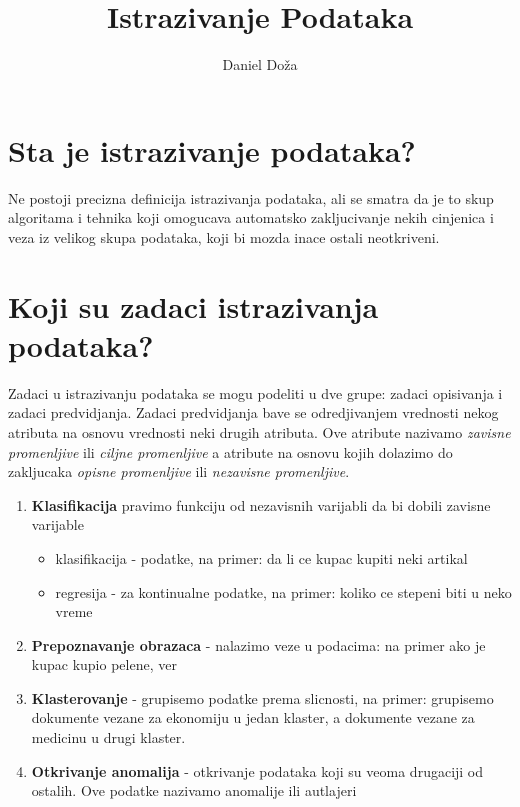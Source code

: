 \documentclass[a4paper]{article}
\begin{document}
\title{Istrazivanje Podataka}

\author{Daniel Doža}

\maketitle

\section{Sta je istrazivanje podataka?}

Ne postoji precizna definicija istrazivanja podataka, ali se smatra da je to skup algoritama i
tehnika koji omogucava automatsko zakljucivanje nekih cinjenica i veza iz velikog skupa podataka,
koji bi mozda inace ostali neotkriveni.

\section{Koji su zadaci istrazivanja podataka?}

Zadaci u istrazivanju podataka se mogu podeliti u dve grupe: zadaci opisivanja i zadaci
predvidjanja. Zadaci predvidjanja bave se odredjivanjem vrednosti nekog atributa na osnovu vrednosti
neki drugih atributa. Ove atribute nazivamo \emph{zavisne promenljive} ili \emph{ciljne promenljive}
a atribute na osnovu kojih dolazimo do zakljucaka \emph{opisne promenljive} ili \emph{nezavisne
promenljive}.

\begin{enumerate}
    \item \textbf{Klasifikacija} pravimo funkciju od nezavisnih varijabli da bi dobili zavisne
        varijable
    \begin{itemize}
        \item klasifikacija - podatke, na primer: da li ce kupac kupiti neki artikal
        \item regresija - za kontinualne podatke, na primer: koliko ce stepeni biti u neko vreme
    \end{itemize}
    \item \textbf{Prepoznavanje obrazaca} - nalazimo veze u podacima: na primer ako je kupac kupio
        pelene, ver
    \item \textbf{Klasterovanje} - grupisemo podatke prema slicnosti, na primer: grupisemo dokumente
        vezane za ekonomiju u jedan klaster, a dokumente vezane za medicinu u drugi klaster.
    \item \textbf{Otkrivanje anomalija} - otkrivanje podataka koji su veoma drugaciji od ostalih.
        Ove podatke nazivamo anomalije ili autlajeri
\end{enumerate}
\end{document}
